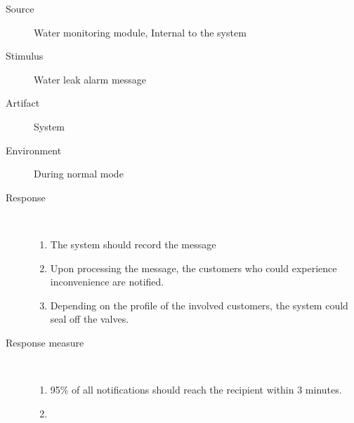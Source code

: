 \begin{description}
	\item[Source] Water monitoring module, Internal to the system
	\item[Stimulus] Water leak alarm message
	\item[Artifact] System
	\item[Environment] During normal mode
	\item[Response] \
		\begin{enumerate}
		  \item The system should record the message
		  \item Upon processing the message, the customers who could experience
		  inconvenience are notified.
		  \item Depending on the profile of the involved customers, the system
		  could seal off the valves.
		\end{enumerate}
	\item[Response measure] \
	\begin{enumerate}
	  \item 95\% of all notifications should reach the recipient within 3 minutes.
	  \item %
	\end{enumerate} 
\end{description}
